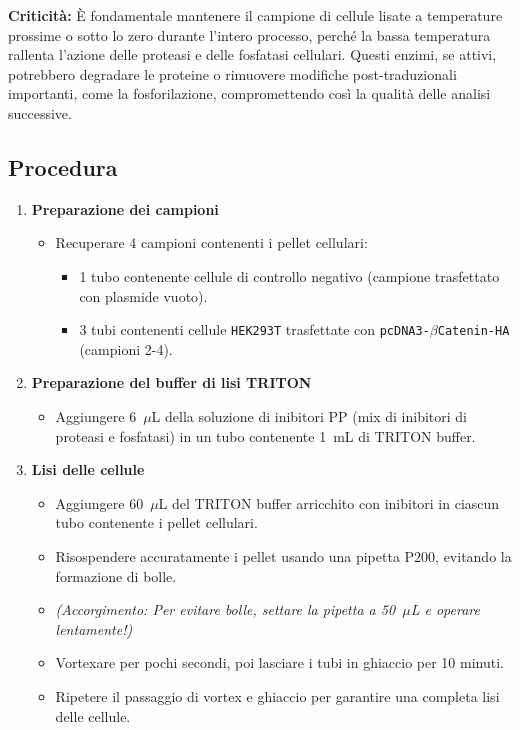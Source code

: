 \begin{criticitaBox}
  \textbf{Criticità:} È fondamentale mantenere il campione di cellule lisate a temperature prossime o sotto lo zero durante l’intero processo, perché la bassa temperatura rallenta l’azione delle proteasi e delle fosfatasi cellulari.  
  Questi enzimi, se attivi, potrebbero degradare le proteine o rimuovere modifiche post-traduzionali importanti, come la fosforilazione, compromettendo così la qualità delle analisi successive.
\end{criticitaBox}
\vspace{1em}
\normalsize\subsection{Procedura}
\begin{enumerate}
\item \textbf{Preparazione dei campioni}
\begin{itemize}
\item Recuperare 4 campioni contenenti i pellet cellulari:
\begin{itemize}
\item 1 tubo contenente cellule di controllo negativo (campione trasfettato con plasmide vuoto).
\item 3 tubi contenenti cellule \texttt{HEK293T} trasfettate con \texttt{pcDNA3-$\beta$Catenin-HA} (campioni 2-4).
\end{itemize}
\end{itemize}

\item \textbf{Preparazione del buffer di lisi TRITON}
\begin{itemize}
\item Aggiungere 6~$\mu$L della soluzione di inibitori PP (mix di inibitori di proteasi e fosfatasi) in un tubo contenente 1~mL di TRITON buffer.
\end{itemize}

\item \textbf{Lisi delle cellule}
\begin{itemize}
\item Aggiungere 60~$\mu$L del TRITON buffer arricchito con inibitori in ciascun tubo contenente i pellet cellulari.
\item Risospendere accuratamente i pellet usando una pipetta P200, evitando la formazione di bolle.
\item \textit{(Accorgimento: Per evitare bolle, settare la pipetta a 50~$\mu$L e operare lentamente!)}
\item Vortexare per pochi secondi, poi lasciare i tubi in ghiaccio per 10 minuti.
\item Ripetere il passaggio di vortex e ghiaccio per garantire una completa lisi delle cellule.
\end{itemize}


\end{enumerate}
